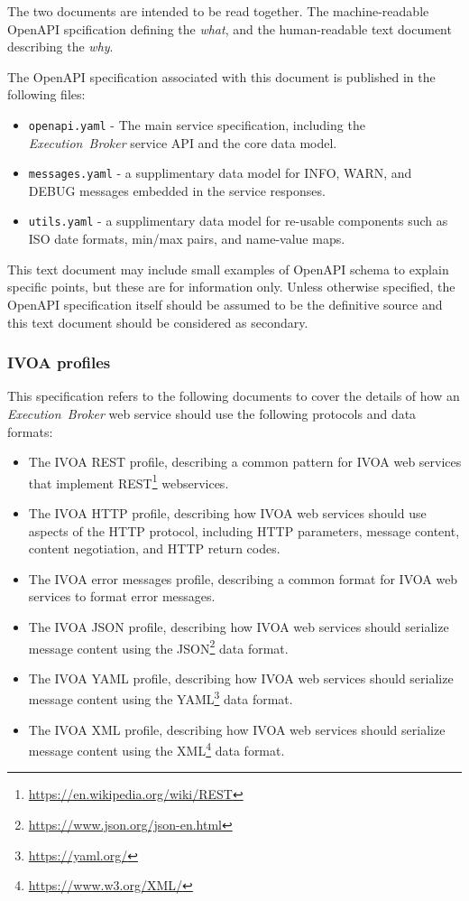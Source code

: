 \documentclass[11pt,a4paper]{ivoa}
\newcommand{\xml} {XML}
\newcommand{\json} {JSON}
\newcommand{\yaml} {YAML}
\newcommand{\http} {HTTP}
\newcommand{\rest} {REST}
\newcommand{\openapi} {OpenAPI}
\newcommand{\webservice} {web service}
\newcommand{\ivoa} {IVOA}
\newcommand{\executionbroker} {\textit{Execution~Broker}}
\newcommand{\codeword}[1] {\texttt{#1}}
\newcommand{\footurl}[1] {\footnote{\url{#1}}}
\begin{document}
The two documents are intended to be read together.
The machine-readable \openapi{} spcification defining the \textit{what},
and the human-readable text document describing the \textit{why}.

The \openapi{} specification associated with this document is
published in the following files:
\begin{itemize}
    \item \codeword{openapi.yaml} - The main service specification, including
    the \executionbroker{} service API and the core data model.
    \item \codeword{messages.yaml} - a supplimentary data model for INFO, WARN,
    and DEBUG messages embedded in the service responses.
    \item \codeword{utils.yaml} - a supplimentary data model for re-usable
    components such as ISO date formats, min/max pairs, and name-value maps.
\end{itemize}

This text document may include small examples of \openapi{} schema to
explain specific points, but these are for information only. Unless otherwise
specified, the \openapi{} specification itself should be assumed to be the
definitive source and this text document should be considered as secondary.

\subsubsection{IVOA profiles}
\label{subsub-ivoa-profiles}

This specification refers to the following documents
to cover the details of how an \executionbroker{} \webservice{}
should use the following protocols and data formats:
\begin{itemize}
    \item The \ivoa{} \rest{} profile, describing a common pattern
    for \ivoa{} \webservice{s} that implement
    \rest{}\footurl{https://en.wikipedia.org/wiki/REST}
    webservices.
    \item The \ivoa{} \http{} profile, describing how \ivoa{} \webservice{s}
    should use aspects of the \http{} protocol, including \http{} parameters,
    message content, content negotiation, and \http{} return codes.
    \item The \ivoa{} error messages profile, describing a common format
    for \ivoa{} \webservice{s} to format error messages.
    \item The \ivoa{} \json{} profile, describing how \ivoa{} \webservice{s}
    should serialize message content using the
    \json{}\footurl{https://www.json.org/json-en.html} data format.
    \item The \ivoa{} \yaml{} profile, describing how \ivoa{} \webservice{s}
    should serialize message content using the
    \yaml{}\footurl{https://yaml.org/} data format.
    \item The \ivoa{} \xml{} profile, describing how \ivoa{} \webservice{s}
    should serialize message content using the
    \xml{}\footurl{https://www.w3.org/XML/} data format.
\end{itemize}
\end{document}
